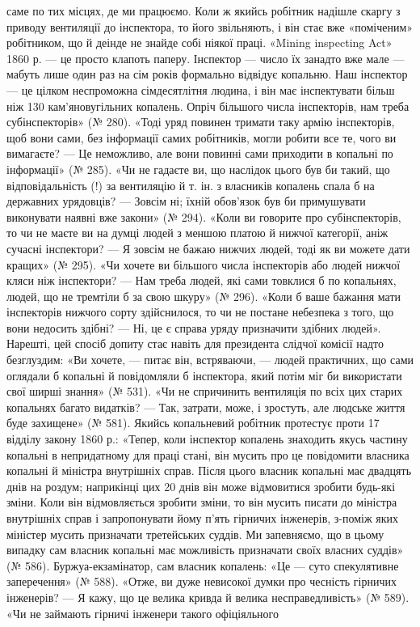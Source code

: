 \parcont{}  %
саме по тих місцях, де ми працюємо. Коли ж якийсь робітник
надішле скаргу з приводу вентиляції до інспектора, то його звільняють,
і він стає вже «поміченим» робітником, що й деінде не
знайде собі ніякої праці. «Mining inspecting Act» 1860 р. —
це просто клапоть паперу. Інспектор — число їх занадто вже
мале — мабуть лише один раз на сім років формально відвідує
копальню. Наш інспектор — це цілком неспроможна сімдесятлітня
людина, і він має інспектувати більш ніж 130 кам’яновугільних
копалень. Опріч більшого числа інспекторів, нам треба
субінспекторів» (№ 280). «Тоді уряд повинен тримати таку армію
інспекторів, щоб вони сами, без інформації самих робітників,
могли робити все те, чого ви вимагаєте? — Це неможливо, але
вони повинні сами приходити в копальні по інформації» (№ 285).
«Чи не гадаєте ви, що наслідок цього був би такий, що відповідальність
(!) за вентиляцію й т. ін. з власників копалень спала б
на державних урядовців? — Зовсім ні; їхній обов’язок був би
примушувати виконувати наявні вже закони» (№ 294). «Коли ви
говорите про субінспекторів, то чи не маєте ви на думці людей
з меншою платою й нижчої категорії, аніж сучасні інспектори? —
Я зовсім не бажаю нижчих людей, тоді як ви можете дати кращих»
(№ 295). «Чи хочете ви більшого числа інспекторів або
людей нижчої кляси ніж інспектори? — Нам треба людей, які
сами товклися б по копальнях, людей, що не тремтіли б за свою
шкуру» (№ 296). «Коли б ваше бажання мати інспекторів нижчого
сорту здійснилося, то чи не постане небезпека з того, що
вони недосить здібні? — Ні, це є справа уряду призначити
здібних людей». Нарешті, цей спосіб допиту стає навіть для
президента слідчої комісії надто безглуздим: «Ви хочете, — питає
він, встряваючи, — людей практичних, що сами оглядали б
копальні й повідомляли б інспектора, який потім міг би використати
свої ширші знання» (№ 531). «Чи не спричинить вентиляція
по всіх цих старих копальнях багато видатків? — Так,
затрати, може, і зростуть, але людське життя буде захищене»
(№ 581). Якийсь копальневий робітник протестує проти 17 відділу
закону 1860 р.: «Тепер, коли інспектор копалень знаходить
якусь частину копальні в непридатному для праці стані, він
мусить про це повідомити власника копальні й міністра внутрішніх
справ. Після цього власник копальні має двадцять днів на
роздум; наприкінці цих 20 днів він може відмовитися зробити
будь-які зміни. Коли він відмовляється зробити зміни, то він
мусить писати до міністра внутрішніх справ і запропонувати
йому п’ять гірничих інженерів, з-поміж яких міністер мусить
призначати третейських суддів. Ми запевняємо, що в цьому випадку
сам власник копальні має можливість призначати своїх
власних суддів» (№ 586). Буржуа-екзамінатор, сам власник
копалень: «Це — суто спекулятивне заперечення» (№ 588). «Отже,
ви дуже невисокої думки про чесність гірничих інженерів? —
Я кажу, що це велика кривда й велика несправедливість»
(№ 589). «Чи не займають гірничі інженери такого офіціяльного
\parbreak{}  %
